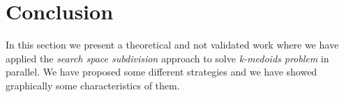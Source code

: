 %
%
%
%
%
%

\section{Conclusion}

In this section we present a theoretical and not validated work where we have applied the {\it search space subdivision} approach to solve {\it k-medoids problem} in parallel. We have proposed some different strategies and we have showed graphically some characteristics of them. 